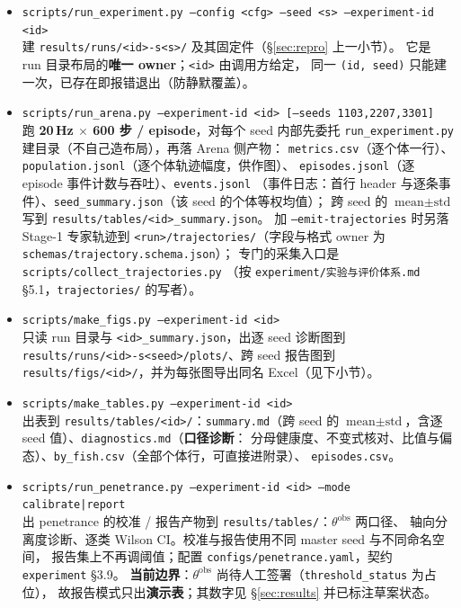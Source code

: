 {\footnotesize \begin{itemize}
  \item \texttt{scripts/run\_experiment.py --config <cfg> --seed <s> --experiment-id <id>}\\
        建 \texttt{results/runs/<id>-s<s>/} 及其固定件（\S\ref{sec:repro} 上一小节）。
        它是 run 目录布局的\textbf{唯一 owner}；\texttt{<id>} 由调用方给定，
        同一 \texttt{(id, seed)} 只能建一次，已存在即报错退出（防静默覆盖）。
  \item \texttt{scripts/run\_arena.py --experiment-id <id> [--seeds 1103,2207,3301]}\\
        跑 \textbf{20\,Hz $\times$ 600 步 / episode}，对每个 seed 内部先委托
        \texttt{run\_experiment.py} 建目录（不自己造布局），再落 Arena 侧产物：
        \texttt{metrics.csv}（逐个体一行）、\texttt{population.jsonl}（逐个体轨迹幅度，供作图）、
        \texttt{episodes.jsonl}（逐 episode 事件计数与吞吐）、\texttt{events.jsonl}
        （事件日志：首行 header 与逐条事件）、\texttt{seed\_summary.json}（该 seed 的个体等权均值）；
        跨 seed 的 $\text{mean}\pm\text{std}$ 写到
        \texttt{results/tables/<id>\_summary.json}。
        加 \texttt{--emit-trajectories} 时另落 Stage-1 专家轨迹到
        \texttt{<run>/trajectories/}（字段与格式 owner 为
        \texttt{schemas/trajectory.schema.json}）；
        专门的采集入口是 \texttt{scripts/collect\_trajectories.py}
        （按 \texttt{experiment/实验与评价体系.md} \S5.1，\texttt{trajectories/} 的写者）。
  \item \texttt{scripts/make\_figs.py --experiment-id <id>}\\
        只读 run 目录与 \texttt{<id>\_summary.json}，出逐 seed 诊断图到
        \texttt{results/runs/<id>-s<seed>/plots/}、跨 seed 报告图到
        \texttt{results/figs/<id>/}，并为每张图导出同名 Excel（见下小节）。
  \item \texttt{scripts/make\_tables.py --experiment-id <id>}\\
        出表到 \texttt{results/tables/<id>/}：\texttt{summary.md}（跨 seed 的
        $\text{mean}\pm\text{std}$，含逐 seed 值）、\texttt{diagnostics.md}（\textbf{口径诊断}：
        分母健康度、不变式核对、比值与偏态）、\texttt{by\_fish.csv}（全部个体行，可直接进附录）、
        \texttt{episodes.csv}。
  \item \texttt{scripts/run\_penetrance.py --experiment-id <id> --mode calibrate|report}\\
        出 penetrance 的校准 / 报告产物到 \texttt{results/tables/}：$\theta^{\mathrm{obs}}$ 两口径、
        轴向分离度诊断、逐类 Wilson CI。校准与报告使用不同 master seed 与不同命名空间，
        报告集上不再调阈值；配置 \texttt{configs/penetrance.yaml}，契约 \texttt{experiment} \S3.9。
        \textbf{当前边界}：$\theta^{\mathrm{obs}}$ 尚待人工签署（\texttt{threshold\_status} 为占位），
        故报告模式只出\textbf{演示表}；其数字见 \S\ref{sec:results} 并已标注草案状态。
\end{itemize}}

